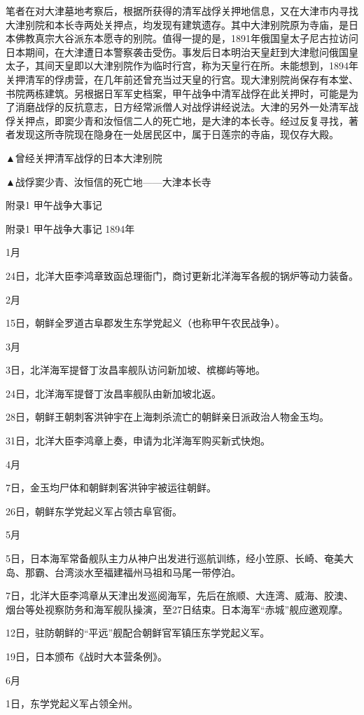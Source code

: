 \documentclass[12pt,UTF8]{ctexbook}
\begin{document}
笔者在对大津墓地考察后，根据所获得的清军战俘关押地信息，又在大津市内寻找大津别院和本长寺两处关押点，均发现有建筑遗存。其中大津别院原为寺庙，是日本佛教真宗大谷派东本愿寺的别院。值得一提的是，1891年俄国皇太子尼古拉访问日本期间，在大津遭日本警察袭击受伤。事发后日本明治天皇赶到大津慰问俄国皇太子，其间天皇即以大津别院作为临时行宫，称为天皇行在所。未能想到，1894年关押清军的俘虏营，在几年前还曾充当过天皇的行宫。现大津别院尚保存有本堂、书院两栋建筑。另根据日军军史档案，甲午战争中清军战俘在此关押时，可能是为了消磨战俘的反抗意志，日方经常派僧人对战俘讲经说法。大津的另外一处清军战俘关押点，即窦少青和汝恒信二人的死亡地，是大津的本长寺。经过反复寻找，著者发现这所寺院现在隐身在一处居民区中，属于日莲宗的寺庙，现仅存大殿。


▲曾经关押清军战俘的日本大津别院


▲战俘窦少青、汝恒信的死亡地——大津本长寺

附录1 甲午战争大事记

附录1
甲午战争大事记
1894年

1月

24日，北洋大臣李鸿章致函总理衙门，商讨更新北洋海军各舰的锅炉等动力装备。

2月

15日，朝鲜全罗道古阜郡发生东学党起义（也称甲午农民战争）。

3月

3日，北洋海军提督丁汝昌率舰队访问新加坡、槟榔屿等地。

24日，北洋海军提督丁汝昌率舰队由新加坡北返。

28日，朝鲜王朝刺客洪钟宇在上海刺杀流亡的朝鲜亲日派政治人物金玉均。

31日，北洋大臣李鸿章上奏，申请为北洋海军购买新式快炮。

4月

7日，金玉均尸体和朝鲜刺客洪钟宇被运往朝鲜。

26日，朝鲜东学党起义军占领古阜官衙。

5月

5日，日本海军常备舰队主力从神户出发进行巡航训练，经小笠原、长崎、奄美大岛、那霸、台湾淡水至福建福州马祖和马尾一带停泊。

7日，北洋大臣李鸿章从天津出发巡阅海军，先后在旅顺、大连湾、威海、胶澳、烟台等处视察防务和海军舰队操演，至27日结束。日本海军“赤城”舰应邀观摩。

12日，驻防朝鲜的“平远”舰配合朝鲜官军镇压东学党起义军。

19日，日本颁布《战时大本营条例》。

6月

1日，东学党起义军占领全州。
\end{document}
